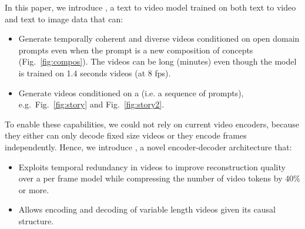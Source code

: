 In this paper, we introduce \phenaki, a text to video model trained on both text to video and text to image data that can:
\begin{itemize}[leftmargin=0.2in]
    \item[--] Generate temporally coherent and diverse videos conditioned on open domain prompts even when the prompt is a new composition of concepts (Fig.~\ref{fig:compos}). The videos can be long (minutes) even though the model is trained on 1.4 seconds videos (at 8 fps).
    \item[--] Generate videos conditioned on a \story (i.e. a sequence of prompts), e.g.~Fig.~\ref{fig:story} and Fig.~\ref{fig:story2}.
\end{itemize}

To enable these capabilities, we could not rely on current video encoders, because they either can only decode fixed size videos or they encode frames independently. Hence, we introduce \cvivit, a novel encoder-decoder architecture that:
\begin{itemize}[leftmargin=0.2in]
\item[--] Exploits temporal redundancy in videos to improve reconstruction quality over a per frame model while compressing the number of video tokens by 40\% or more.
\item[--] Allows encoding and decoding of variable length videos given its causal structure.
\end{itemize}



